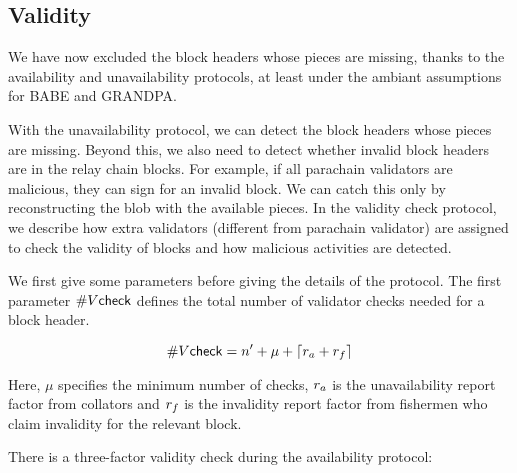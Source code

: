 \subsection{Validity}
\label{sec:validity}

We have now excluded the block headers whose pieces are missing, thanks to the availability and unavailability protocols, at least under the ambiant assumptions for BABE and GRANDPA.



With the unavailability protocol, we can detect the block headers whose pieces are missing. Beyond this, we also need to detect whether invalid block headers are in the relay chain blocks. For example, if all parachain validators are malicious, they can sign for an invalid block. We can catch this only by reconstructing the blob with the available pieces. In the validity check protocol, we describe how extra validators (different from parachain validator) are assigned to check the validity of blocks and how malicious activities are detected.


We first give some parameters before giving the details of the protocol.
The first parameter $\#V\mathsf{check}$ defines the total number of validator checks needed for a block header.

$$\#V\mathsf{check} = n' + \mu +\lceil r_{a} + r_{f} \rceil$$

Here, $\mu$ specifies the minimum number of checks, $r_{a}$ is the unavailability report factor from collators and $r_{f}$ is the invalidity report factor from fishermen who claim invalidity for the relevant block. 






There is a three-factor validity check during the availability protocol:


